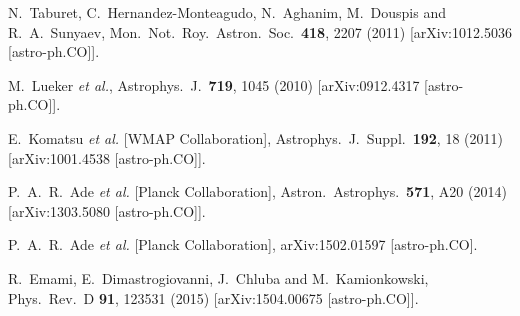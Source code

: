 \documentclass[aps,twocolumn,floats,prd,nofootinbib,10pt,floatfix]{revtex4-1}
\begin{document}
\begin{thebibliography}{99}
  N.~Taburet, C.~Hernandez-Monteagudo, N.~Aghanim, M.~Douspis and R.~A.~Sunyaev,
  Mon.\ Not.\ Roy.\ Astron.\ Soc.\  {\bf 418}, 2207 (2011)
  [arXiv:1012.5036 [astro-ph.CO]].


  M.~Lueker {\it et al.},
  Astrophys.\ J.\  {\bf 719}, 1045 (2010)
  [arXiv:0912.4317 [astro-ph.CO]].


  E.~Komatsu {\it et al.} [WMAP Collaboration],
  Astrophys.\ J.\ Suppl.\  {\bf 192}, 18 (2011)
  [arXiv:1001.4538 [astro-ph.CO]].


  P.~A.~R.~Ade {\it et al.} [Planck Collaboration],
  Astron.\ Astrophys.\  {\bf 571}, A20 (2014)
  [arXiv:1303.5080 [astro-ph.CO]].


  P.~A.~R.~Ade {\it et al.} [Planck Collaboration],
  arXiv:1502.01597 [astro-ph.CO].


  R.~Emami, E.~Dimastrogiovanni, J.~Chluba and M.~Kamionkowski,
  Phys.\ Rev.\ D {\bf 91}, 123531 (2015)
  [arXiv:1504.00675 [astro-ph.CO]].


\end{thebibliography}
\end{document}
